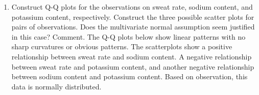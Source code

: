 \begin{enumerate}[label=(\alph*)]
    \[
        n
        {\left(\bar{\textbf{x}} - \bm{\mu}_{0}\right)}^{\prime}
        \textbf{S}^{-1}
        \left(\bar{\textbf{x}} - \bm{\mu}_{0}\right)
        =
    \]
    \begin{multline*}
        =
        20
        \begin{bNiceArray}{ccc}
            4.64 - \mu_{1} & 45.4 - \mu_{2} & 9.965 - \mu_{3}
        \end{bNiceArray}
        \\
        \times
        \begin{bNiceArray}{rrr}
            0.5862  & -0.0221 & 0.2580 \\
            -0.0221 &  0.0061 & -0.0016 \\
            0.2580  & -0.0016 & 0.4018
        \end{bNiceArray}
        \begin{bNiceArray}{c}
            4.64 - \mu_{1} \\
            45.4 - \mu_{2} \\
            9.965 - \mu_{3}
        \end{bNiceArray}
    \end{multline*}
    The major axis of the confidence ellipse is the eigenvector related to the largest eigenvalue and its length is also proportional to the value of the largest eigenvalue. The half-lengths of the major and minor axis are given by
    \[
        \sqrt{\lambda_{1}}
        \sqrt{\frac{p(n-1)}{n(n-p)}}
        F_{p, n-p}(\alpha)
        =
        \sqrt{200.4625}
        \sqrt{\frac{3(19)}{20(17)} (2.4374)}
        =
        9.0507
    \]
    and
    \[
        \sqrt{\lambda_{3}}
        \sqrt{\frac{p(n-1)}{n(n-p)}}
        F_{p, n-p}(\alpha)
        =
        \sqrt{1.3014}
        \sqrt{\frac{3(19)}{20(17)} (2.4374)}
        =
        0.7292
    \]

    \item Construct Q-Q plots for the observations on sweat rate, sodium content, and
    potassium content, respectively. Construct the three possible scatter plots for pairs
    of observations. Does the multivariate normal assumption seem justified in this
    case? Comment.
    \newline
    The Q-Q plots below show linear patterns with no sharp curvatures or obvious patterns. The scatterplots show a positive relationship between sweat rate and sodium content. A negative relationship between sweat rate and potassium content, and another negative relationship between sodium content and potassium content. Based on observation, this data is normally distributed.
    

\end{enumerate}
